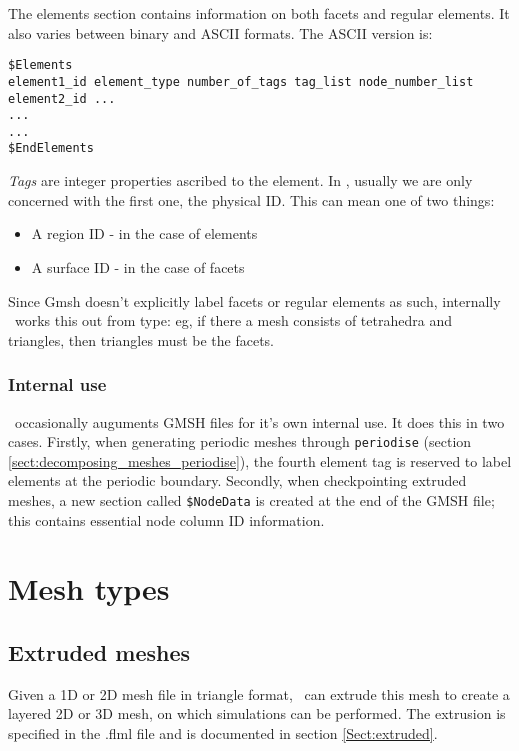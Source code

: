 The elements section contains information on both facets and regular
elements. It also varies between binary and ASCII formats. The ASCII version
is:

\begin{lstlisting}
$Elements
element1_id element_type number_of_tags tag_list node_number_list
element2_id ...
...
...
$EndElements
\end{lstlisting}
\textit{Tags} are integer properties ascribed to the element. In \fluidity,
usually we are only concerned with the first one, the physical ID. This can mean
one of two things:

\begin{itemize}
\item A region ID - in the case of elements
\item A surface ID - in the case of facets
\end{itemize}

Since Gmsh doesn't explicitly label facets or regular elements as such,
internally \fluidity\ works this out from type: eg, if there a mesh consists
of tetrahedra and triangles, then triangles must be the facets.

\subsubsection*{Internal use }
\label{sect:gmsh_internal_use_section}

\fluidity\ occasionally auguments GMSH files for it's own internal use. It
does this in two cases. Firstly, when generating periodic meshes 
through \lstinline+periodise+ (section \ref{sect:decomposing_meshes_periodise}), the
fourth element tag is reserved to label elements at the periodic boundary.
Secondly, when checkpointing extruded meshes, a new section called
\lstinline+$NodeData+ is created at the end of the GMSH file; this contains
essential node column ID information.
 

\section{Mesh types}
\subsection{Extruded meshes}
\label{sect:extruded_meshes}

Given a 1D or 2D mesh file in triangle format, \fluidity\ can extrude this
mesh to create a layered 2D or 3D mesh, on which simulations can be
performed. The extrusion is specified in the .flml file and is documented in
section \ref{Sect:extruded}.

